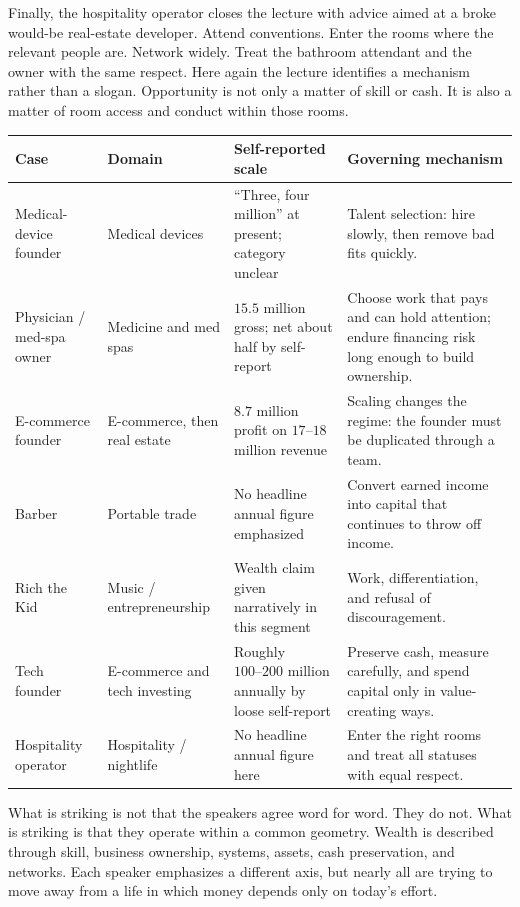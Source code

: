 Finally, the hospitality operator closes the lecture with advice aimed at a broke would-be real-estate developer. Attend conventions. Enter the rooms where the relevant people are. Network widely. Treat the bathroom attendant and the owner with the same respect. Here again the lecture identifies a mechanism rather than a slogan. Opportunity is not only a matter of skill or cash. It is also a matter of room access and conduct within those rooms.

\begin{table}[h]
\centering
\begin{tabular}{|p{}|p{}|p{}|p{}|}
\hline
Case & Domain & Self-reported scale & Governing mechanism \\
\hline
Medical-device founder & Medical devices & ``Three, four million'' at present; category unclear & Talent selection: hire slowly, then remove bad fits quickly. \\
\hline
Physician / med-spa owner & Medicine and med spas & \(15.5\) million gross; net about half by self-report & Choose work that pays and can hold attention; endure financing risk long enough to build ownership. \\
\hline
E-commerce founder & E-commerce, then real estate & \(8.7\) million profit on \(17\text{--}18\) million revenue & Scaling changes the regime: the founder must be duplicated through a team. \\
\hline
Barber & Portable trade & No headline annual figure emphasized & Convert earned income into capital that continues to throw off income. \\
\hline
Rich the Kid & Music / entrepreneurship & Wealth claim given narratively in this segment & Work, differentiation, and refusal of discouragement. \\
\hline
Tech founder & E-commerce and tech investing & Roughly \(100\text{--}200\) million annually by loose self-report & Preserve cash, measure carefully, and spend capital only in value-creating ways. \\
\hline
Hospitality operator & Hospitality / nightlife & No headline annual figure here & Enter the right rooms and treat all statuses with equal respect. \\
\hline
\end{tabular}
\end{table}

What is striking is not that the speakers agree word for word. They do not. What is striking is that they operate within a common geometry. Wealth is described through skill, business ownership, systems, assets, cash preservation, and networks. Each speaker emphasizes a different axis, but nearly all are trying to move away from a life in which money depends only on today's effort.


